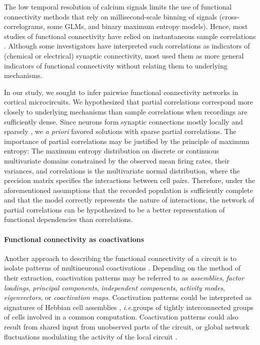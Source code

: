 \documentclass[10pt]{article}
\newcommand{\Kcomment}[1]{{\color{blue}{[KJ: #1]}}}
\newcommand{\ie}{\emph{i.e.}\;}
\begin{document}
The low temporal resolution of calcium signals limits the use of functional connectivity methods that rely on millisecond-scale binning of signals (cross-correlograms, some GLMs, and binary maximum entropy models).  Hence, most studies of functional connectivity have relied on instantaneous sample correlations \cite{Greenberg:2008, Golshani:2009, Hofer:2011, Malmersjo:2013} .  Although some investigators have interpreted such correlations as indicators of (chemical or electrical) synaptic connectivity, most used them as more general indicators of functional connectivity without relating them to underlying mechanisms. 

In our study, we sought to infer pairwise functional connectivity networks  in cortical microcircuits. We hypothesized that partial correlations correspond more closely to underlying mechanisms than sample correlations when recordings are sufficiently dense.  Since neurons form synaptic connections mostly locally and sparsely \cite{Perin:2011}, we \emph{a priori} favored solutions with sparse partial correlations.  The importance of partial correlations may be justified by the principle of maximum entropy: The maximum entropy distribution on discrete or continuous multivariate domains constrained by the observed mean firing rates, their variances, and correlations is the multivariate normal distribution, where the precision matrix specifies the interactions between cell pairs.  Therefore, under the aforementioned assumptions that the recorded population is sufficiently complete and that the model correctly represents the nature of interactions, the network of partial correlations can be hypothesized to be a better representation of functional dependencies than correlations. %

\paragraph{Functional connectivity as coactivations}
Another approach to describing the functional connectivity of a circuit is to isolate patterns of multineuronal coactivations \cite{Gerstein:1989, Chapin:1999, Peyrache:2010, Ch:2010, Lopes:2011, Lopes:2013}. Depending on the method of their extraction, coactivation patterns may be referred to as \emph{assemblies}, \emph{factor loadings}, \emph{principal components}, \emph{independent components}, \emph{activity modes}, \emph{eigenvectors}, or \emph{coactivation maps}. Coactivation patterns could be interpreted as signatures of Hebbian cell assemblies \cite{Gerstein:1989, Ch:2010}, \ie groups of tightly interconnected groups of cells involved in a common computation.  Coactivation patterns could also result from shared input from unobserved parts of the circuit, or global network fluctuations modulating the activity of the local circuit \cite{Okun:2012}.
\end{document}
